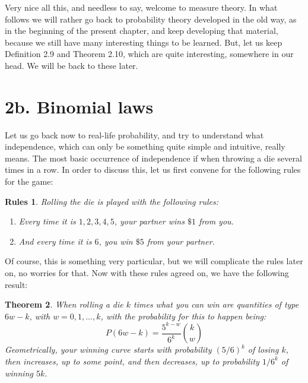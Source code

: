 \documentclass[12pt]{amsbook}
\newtheorem{theorem}{Theorem}[chapter]
\newtheorem{rules}[theorem]{Rules}
\begin{document}
Very nice all this, and needless to say, welcome to measure theory. In what follows we will rather go back to probability theory developed in the old way, as in the beginning of the present chapter, and keep developing that material, because we still have many interesting things to be learned. But, let us keep Definition 2.9 and Theorem 2.10, which are quite interesting, somewhere in our head. We will be back to these later.

\section*{2b. Binomial laws}

Let us go back now to real-life probability, and try to understand what independence, which can only be something quite simple and intuitive, really means. The most basic occurrence of independence if when throwing a die several times in a row. In order to discuss this, let us first convene for the following rules for the game:

\begin{rules}
Rolling the die is played with the following rules:
\begin{enumerate}
\item Every time it is $1,2,3,4,5$, your partner wins $\$1$ from you.

\item And every time it is $6$, you win $\$5$ from your partner.
\end{enumerate}
\end{rules}

Of course, this is something very particular, but we will complicate the rules later on, no worries for that. Now with these rules agreed on, we have the following result:

\begin{theorem}
When rolling a die $k$ times what you can win are quantities of type $6w-k$, with $w=0,1,\ldots,k$, with the probability for this to happen being:
$$P(6w-k)=\frac{5^{k-w}}{6^k}\binom{k}{w}$$
Geometrically, your winning curve starts with probability $(5/6)^k$ of losing $k$, then increases, up to some point, and then decreases, up to probability $1/6^k$ of winning $5k$.
\end{theorem}
\end{document}
